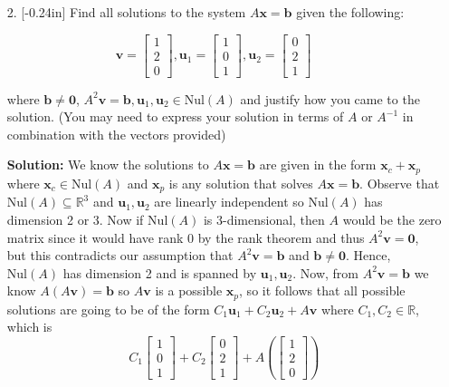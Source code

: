 \documentclass[letterpaper,12pt]{article}
\theoremstyle{definition}
\begin{document}
\newpage
\begin{enumerate}
    \item[2.] \reversemarginpar{}[-0.24in] Find all solutions to the system $A\mathbf{x} = \mathbf{b}$ given the following:
\end{enumerate}
$$\mathbf{v} = \begin{bmatrix}
    1 \\ 2 \\ 0
\end{bmatrix}, \mathbf{u}_1=\begin{bmatrix}
    1 \\ 0 \\ 1
\end{bmatrix},\mathbf{u}_2=\begin{bmatrix}
    0 \\ 2 \\ 1
\end{bmatrix}$$
\begin{enumerate}
    \item[] where $\mathbf{b}\neq\mathbf{0}$, $A^2\mathbf{v} =\mathbf{b}, \mathbf{u}_1,\mathbf{u}_2\in \mathrm{Nul}(A)$ and justify how you came to the solution. (You may need to express your solution in terms of $A$ or $A^{-1}$ in combination with the vectors provided)
    \begin{mdframed}
        \textbf{Solution:}
        We know the solutions to $A\mathbf{x} =\mathbf{b}$ are given in the form $\mathbf{x}_c+\mathbf{x}_p$ where $\mathbf{x}_c \in \mathrm{Nul}(A)$ and $\mathbf{x}_p$ is any solution that solves $A\mathbf{x} =\mathbf{b}$. Observe that $\mathrm{Nul}(A)\subseteq \mathbb{R}^3$ and $\mathbf{u}_1,\mathbf{u}_2$ are linearly independent so $\mathrm{Nul}(A)$ has dimension 2 or 3. Now if $\mathrm{Nul}(A)$ is 3-dimensional, then $A$ would be the zero matrix since it would have rank 0 by the rank theorem and thus $A^2\mathbf{v} = \mathbf{0}$, but this contradicts our assumption that $A^2\mathbf{v} = \mathbf{b}$ and $\mathbf{b} \neq \mathbf{0}$. Hence, $\mathrm{Nul}(A)$ has dimension 2 and is spanned by $\mathbf{u}_1,\mathbf{u}_2$. Now, from $A^2\mathbf{v} = \mathbf{b}$ we know $A(A\mathbf{v}) = \mathbf{b}$ so $A\mathbf{v}$ is a possible $\mathbf{x}_p$, so it follows that all possible solutions are going to be of the form $C_1\mathbf{u}_1+C_2\mathbf{u}_2+A\mathbf{v}$ where $C_1,C_2 \in \mathbb{R}$, which is
        $$C_1\begin{bmatrix}
    1 \\ 0 \\ 1
\end{bmatrix}+C_2\begin{bmatrix}
    0 \\ 2 \\ 1
\end{bmatrix}+A\left (\begin{bmatrix}
    1 \\ 2 \\ 0
\end{bmatrix}\right )$$
    \end{mdframed}
\end{enumerate}
\end{document}
